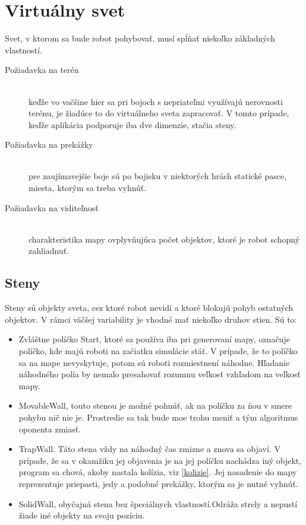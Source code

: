 \section { Virtuálny svet }
Svet, v ktorom sa bude robot pohybovať, musí spĺňať niekoľko základných vlastností. 
\begin {description}
\item[Požiadavka na terén] \hfill \\ keďže vo vačšine hier sa pri bojoch s nepriateľmi využívajú nerovnosti terénu, je žiadúce to do virtuálneho sveta zapracovať. V tomto prípade, keďže aplikácia podporuje iba dve dimenzie, stačia steny.
\item[Požiadavka na prekážky] \hfill \\ pre zaujímavejšie boje sú po bojisku v niektorých hrách statické pasce, miesta, ktorým sa treba vyhnúť.
\item[Požiadavka na viditeľnosť]\hfill \\ charakteristika mapy ovplyvňujúca počet objektov, ktoré je robot schopný zahliadnuť.
\end {description}
\subsection{Steny}\label{walls} %
Steny sú objekty sveta, cez ktoré robot nevidí a ktoré blokujú pohyb ostatných objektov. V rámci väčšej variability je vhodné mať niekoľko druhov stien. Sú to:\\
\begin{itemize}
\item Zvláštne políčko Start, ktoré sa používa iba pri generovaní mapy, označuje políčko, kde majú roboti na začiatku simulácie stáť. V prípade, že to políčko sa na mape nevyskytuje, potom sú roboti rozmiestnení náhodne. Hľadanie náhodného polía by nemalo presahovať rozumnu veľkosť vzhľadom na veľkosť mapy.
\item MovableWall, touto stenou je možné pohnúť, ak na políčku za ňou v smere pohybu nič nie je. Prostredie sa tak bude moe trohu meniť a tým algoritmus oponenta zmiasť.
\item TrapWall. Táto stena vždy na náhodný čas zmizne a znova sa objaví. V prípade, že sa v okamžiku jej objavenia je na jej políčku nachádza iný objekt, program sa chová, akoby nastala kolízia, viz \ref{kolizie}. Jej nasadenie do mapy reprezentuje priepasti, jedy a podobné prekážky, ktorým sa je nutné vyhnúť.
\item SolidWall, obyčajná stena bez špeciálnych vlastností.Odráža strely a nepustí žiade iné objekty na svoju pozíciu.
\end {itemize}

